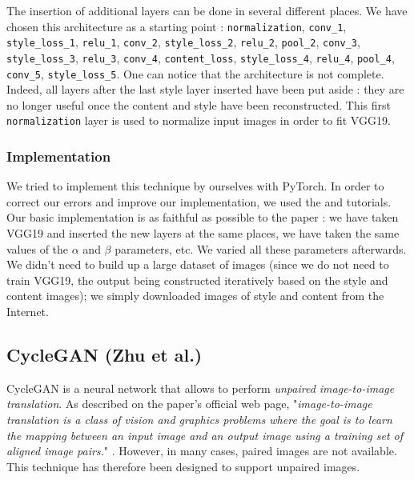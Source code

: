 \documentclass[twocolumn,superscriptaddress,aps,floatfix, nofootinbib]{revtex4-1}
\begin{document}
    The insertion of additional layers can be done in several different places. We have chosen this architecture as a starting point : \texttt{normalization}, \texttt{conv\_1}, \texttt{style\_loss\_1}, \texttt{relu\_1}, \texttt{conv\_2}, \texttt{style\_loss\_2}, \texttt{relu\_2}, \texttt{pool\_2}, \texttt{conv\_3}, \texttt{style\_loss\_3}, \texttt{relu\_3}, \texttt{conv\_4}, \texttt{content\_loss}, \texttt{style\_loss\_4}, \texttt{relu\_4}, \texttt{pool\_4}, \texttt{conv\_5}, \texttt{style\_loss\_5}. One can notice that the architecture is not complete. Indeed, all layers after the last style layer inserted have been put aside : they are no longer useful once the content and style have been reconstructed. This first \texttt{normalization} layer is used to normalize input images in order to fit VGG19.
    
    \subsubsection{Implementation}
    
    We tried to implement this technique by ourselves with PyTorch. In order to correct our errors and improve our implementation, we used the \cite{pytorch.org} and \cite{nextjournal.com} tutorials. Our basic implementation is as faithful as possible to the paper \cite{DBLP:journals/corr/GatysEB15a} : we have taken VGG19 and inserted the new layers at the same places, we have taken the same values of the $\alpha$ and $\beta$ parameters, etc. We varied all these parameters afterwards. We didn't need to build up a large dataset of images (since we do not need to train VGG19, the output being constructed iteratively based on the style and content images); we simply downloaded images of style and content from the Internet.
    
    \subsection{CycleGAN (Zhu et al.)}\label{sec:methods.zhu}
    
    CycleGAN is a neural network that allows to perform \emph{unpaired image-to-image translation}. As described on the paper's official web page, "\emph{image-to-image translation is a class of vision and graphics problems where the goal is to learn the mapping between an input image and an output image using a training set of aligned image pairs.}" \cite{junyanz.github.io}. However, in many cases, paired images are not available. This technique has therefore been designed to support unpaired images.\\
    
\end{document}
